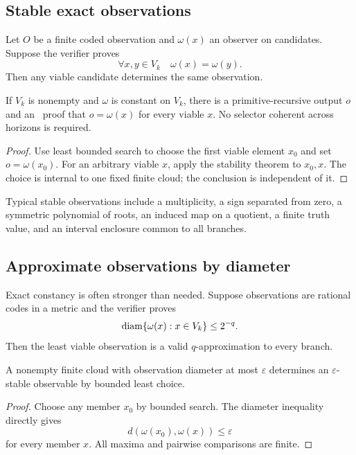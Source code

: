 \subsection{Stable exact observations}

Let \(O\) be a finite coded observation and \(\omega(x)\) an observer on candidates.  Suppose the verifier proves
\[
 \forall x,y\in V_k\quad \omega(x)=\omega(y).
\]
Then any viable candidate determines the same observation.

\begin{theorem}\label{thm:stable-observer}
If \(V_k\) is nonempty and \(\omega\) is constant on \(V_k\), there is a primitive-recursive output \(o\) and an \iPRA\ proof that \(o=\omega(x)\) for every viable \(x\).  No selector coherent across horizons is required.
\end{theorem}

\begin{proof}
Use least bounded search to choose the first viable element \(x_0\) and set \(o=\omega(x_0)\).  For an arbitrary viable \(x\), apply the stability theorem to \(x_0,x\).  The choice is internal to one fixed finite cloud; the conclusion is independent of it.
\end{proof}

Typical stable observations include a multiplicity, a sign separated from zero, a symmetric polynomial of roots, an induced map on a quotient, a finite truth value, and an interval enclosure common to all branches.

\subsection{Approximate observations by diameter}

Exact constancy is often stronger than needed.  Suppose observations are rational codes in a metric and the verifier proves
\[
 \operatorname{diam}\{\omega(x):x\in V_k\}\le 2^{-q}.
\]
Then the least viable observation is a valid \(q\)-approximation to every branch.

\begin{theorem}\label{thm:diameter-elimination}
A nonempty finite cloud with observation diameter at most \(\varepsilon\) determines an \(\varepsilon\)-stable observable by bounded least choice.
\end{theorem}

\begin{proof}
Choose any member \(x_0\) by bounded search.  The diameter inequality directly gives
\[
 d(\omega(x_0),\omega(x))\le\varepsilon
\]
for every member \(x\).  All maxima and pairwise comparisons are finite.
\end{proof}


